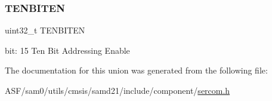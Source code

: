\subsubsection{\texorpdfstring{TENBITEN}{TENBITEN}}
{\footnotesize\ttfamily uint32\+\_\+t T\+E\+N\+B\+I\+T\+EN}

bit\+: 15 Ten Bit Addressing Enable 

The documentation for this union was generated from the following file\+:\begin{DoxyCompactItemize}
\item 
A\+S\+F/sam0/utils/cmsis/samd21/include/component/\mbox{\hyperlink{utils_2cmsis_2samd21_2include_2component_2sercom_8h}{sercom.\+h}}\end{DoxyCompactItemize}
